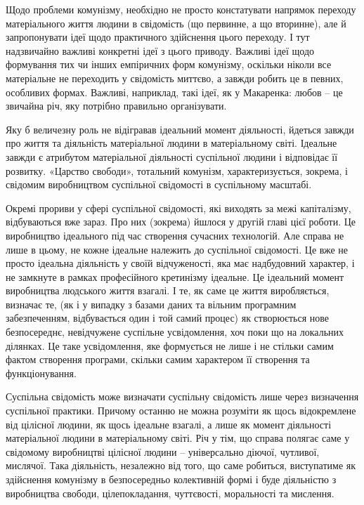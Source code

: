 \documentclass[12pt,a4paper,openany]{book}
\begin{document}
Щодо проблеми комунізму, необхідно не просто констатувати напрямок переходу матеріального життя людини в свідомість (що первинне, а що вторинне), але й запропонувати ідеї щодо практичного здійснення цього переходу. І тут надзвичайно важливі конкретні ідеї з цього приводу. Важливі ідеї щодо формування тих чи інших емпіричних форм комунізму, оскільки ніколи все матеріальне не переходить у свідомість миттєво, а завжди робить це в певних, особливих формах. Важливі, наприклад, такі ідеї, як у Макаренка: любов – це звичайна річ, яку потрібно правильно організувати.

Яку б величезну роль не відігравав ідеальний момент діяльності, йдеться завжди про життя та діяльність матеріальної людини в матеріальному світі. Ідеальне завжди є атрибутом матеріальної діяльності суспільної людини і відповідає її розвитку. «Царство свободи», тотальний комунізм, характеризується, зокрема, і свідомим виробництвом суспільної свідомості в суспільному масштабі.

Окремі прориви у сфері суспільної свідомості, які виходять за межі капіталізму, відбуваються вже зараз. Про них (зокрема) йшлося у другій главі цієї роботи. Це виробництво ідеального під час створення сучасних технологій. Але справа не лише в цьому, не кожне ідеальне належить до суспільної свідомості. Це вже не просто ідеальна діяльність у своїй відчуженості, яка має надбудовний характер, і не замкнуте в рамках професійного кретинізму ідеальне. Це ідеальний момент виробництва людського життя взагалі. І те, як саме це життя виробляється, визначає те, (як і у випадку з базами даних та вільним програмним забезпеченням, відбувається один і той самий процес) як створюється нове безпосереднє, невідчужене суспільне усвідомлення, хоч поки що на локальних ділянках. Це таке усвідомлення, яке формується не лише і не стільки самим фактом створення програми, скільки самим характером її створення та функціонування.

Суспільна свідомість може визначати суспільну свідомість лише через визначення суспільної практики. Причому останню не можна розуміти як щось відокремлене від цілісної людини, як щось ідеальне взагалі, а лише як момент діяльності матеріальної людини в матеріальному світі. Річ у тім, що справа полягає саме у свідомому виробництві цілісної людини – універсально діючої, чутливої, мислячої. Така діяльність, незалежно від того, що саме робиться, виступатиме як здійснення комунізму в безпосередньо колективній формі і буде діяльністю з виробництва свободи, цілепокладання, чуттєвості, моральності та мислення.
\end{document}
